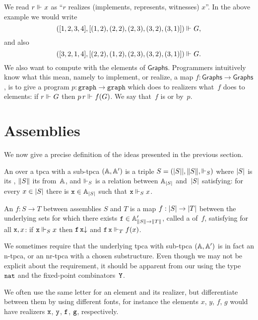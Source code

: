 %
We read $r \rz x$ as ``$r$ realizes (implements, represents, witnesses) $x$''. In the above example we would write
%
\begin{equation*}
([1, 2, 3, 4], [(1,2), (2,2), (2,3), (3,2), (3,1)]) \rz G,
\end{equation*}
%
and also
%
\begin{equation*}
([3, 2, 1, 4], [(2,2), (1,2), (2,3), (3,2), (3,1)]) \rz G.
\end{equation*}
%
We also want to compute with the elements of $\mathsf{Graphs}$.
%
Programmers intuitively know what this mean, namely to implement, or realize, a map $f : \mathsf{Graphs} \to \mathsf{Graphs}$, is to give a program $p : \mathtt{graph} \to \mathtt{graph}$ which does to realizers what~$f$ does to elements: if $r \rz G$ then $p \, r \rz f(G)$. We say that~$f$ is  or  by~$p$.

\section{Assemblies}
\label{sec:assemblies}

We now give a precise definition of the ideas presented in the previous section.

\begin{definition}
  An  over a tpca with a sub-tpca $(\AA, \subAA)$ is a triple
  $S = \xasm{S}$ where $\S{S}$ is its , $\T{S}$ its  from~$\AA$, and $\rz[S]$ is a relation between $\xAtyp{S}$ and~$\S{S}$
  satisfying: for every $x \in \S{S}$ there is $\R{x} \in \xAtyp{S}$ such that $\R{x} \rz[S] x$.

  An  $f : S \to T$ between assemblies $S$ and $T$ is a map $f : \S{S} \to \S{T}$
  between the underlying sets for which there exists $\R{f} \in \subAtyp{\T{S} \to \T{T}}$, called a 
  of~$f$, satisfying for all $\R{x}, x$: if $\R{x} \rz[S] x$ then $\defined{\R{f} \, \R{x}}$ and $\R{f} \, \R{x} \rz[T] f(x)$.
\end{definition}

\noindent
%
We sometimes require that the underlying tpca with sub-tpca $(\AA, \subAA)$ is in fact an n-tpca, or an nr-tpca with a chosen substructure. Even though we may not be explicit about the requirement, it should be apparent from our using the type~$\ttnat$ and the fixed-point combinators~$\combY$.

We often use the same letter for an element and its realizer, but differentiate between them by using different fonts, for instance the elements $x$, $y$, $f$, $g$ would have realizers $\R{x}$, $\R{y}$, $\R{f}$, $\R{g}$, respectively.

